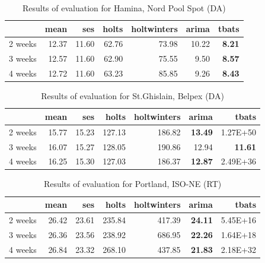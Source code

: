\begin{table}[ht]
\centering
\begin{tabular}{rrrrrrr}
  \hline
 & mean & ses & holts & holtwinters & arima & tbats \\ 
  \hline
2 weeks & 12.37 & 11.60 & 62.76 & 73.98 & 10.22 & \textbf{8.21} \\ 
  3 weeks & 12.57 & 11.60 & 62.90 & 75.55 & 9.50 & \textbf{8.57} \\ 
  4 weeks & 12.72 & 11.60 & 63.23 & 85.85 & 9.26 & \textbf{8.43} \\ 
   \hline
\end{tabular}
\caption{Results of evaluation for Hamina, Nord Pool Spot (DA)} 
\label{tab:aggregated_results_nord_pool}
\end{table}
\begin{table}[ht]
\centering
\begin{tabular}{rrrrrrr}
  \hline
 & mean & ses & holts & holtwinters & arima & tbats \\ 
  \hline
2 weeks & 15.77 & 15.23 & 127.13 & 186.82 & \textbf{13.49} & 1.27E+50 \\ 
  3 weeks & 16.07 & 15.27 & 128.05 & 190.86 & 12.94 & \textbf{11.61} \\ 
  4 weeks & 16.25 & 15.30 & 127.03 & 186.37 & \textbf{12.87} & 2.49E+36 \\ 
   \hline
\end{tabular}
\caption{Results of evaluation for St.Ghislain, Belpex (DA)}
\label{tab:aggregated_results_belpex}
\end{table}
\begin{table}[ht]
\centering
\begin{tabular}{rrrrrrr}
  \hline
 & mean & ses & holts & holtwinters & arima & tbats \\ 
  \hline
2 weeks & 26.42 & 23.61 & 235.84 & 417.39 & \textbf{24.11} & 5.45E+16 \\ 
  3 weeks & 26.36 & 23.56 & 238.92 & 686.95 & \textbf{22.26} & 1.64E+18 \\ 
  4 weeks & 26.84 & 23.32 & 268.10 & 437.85 & \textbf{21.83} & 2.18E+32 \\ 
   \hline
\end{tabular}
\caption{Results of evaluation for Portland, ISO-NE (RT)}
\label{tab:aggregated_results_isone}
\end{table}
